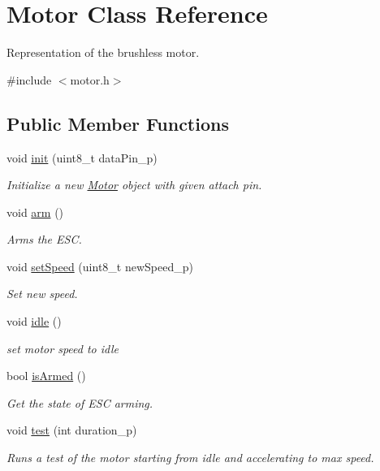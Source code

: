 \hypertarget{class_motor}{}\section{Motor Class Reference}
\label{class_motor}


Representation of the brushless motor.  




{\ttfamily \#include $<$motor.\+h$>$}

\subsection*{Public Member Functions}
\begin{DoxyCompactItemize}
\item 
void \hyperlink{class_motor_a62bf4d19aed7729c5dd4a2c1148c86f8}{init} (uint8\+\_\+t data\+Pin\+\_\+p)
\begin{DoxyCompactList}\small\item\em Initialize a new \hyperlink{class_motor}{Motor} object with given attach pin. \end{DoxyCompactList}\item 
void \hyperlink{class_motor_af21376271175d094adf9a077f70d2208}{arm} ()
\begin{DoxyCompactList}\small\item\em Arms the E\+SC. \end{DoxyCompactList}\item 
void \hyperlink{class_motor_a0d852462f8afab5d980d2507d1915447}{set\+Speed} (uint8\+\_\+t new\+Speed\+\_\+p)
\begin{DoxyCompactList}\small\item\em Set new speed. \end{DoxyCompactList}\item 
\mbox{\label{class_motor_a0cffd54bdf0fa79b4ac7bae5ffd9a103}} 
void \hyperlink{class_motor_a0cffd54bdf0fa79b4ac7bae5ffd9a103}{idle} ()
\begin{DoxyCompactList}\small\item\em set motor speed to idle \end{DoxyCompactList}\item 
bool \hyperlink{class_motor_a9f6e92bbf36d9f68665bc1e02af075b6}{is\+Armed} ()
\begin{DoxyCompactList}\small\item\em Get the state of E\+SC arming. \end{DoxyCompactList}\item 
void \hyperlink{class_motor_a0c2e15bba82f033dafb3b45ea874692f}{test} (int duration\+\_\+p)
\begin{DoxyCompactList}\small\item\em Runs a test of the motor starting from idle and accelerating to max speed. \end{DoxyCompactList}\end{DoxyCompactItemize}


